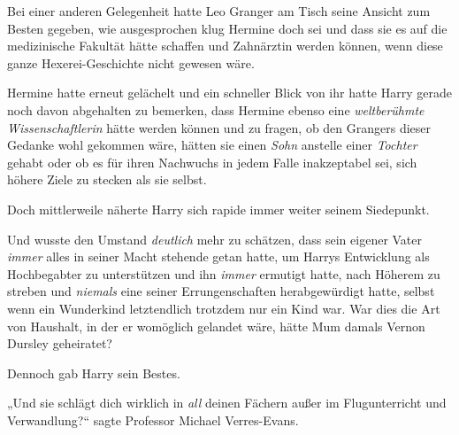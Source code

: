Bei einer anderen Gelegenheit hatte Leo Granger am Tisch seine Ansicht zum Besten gegeben, wie ausgesprochen klug Hermine doch sei und dass sie es auf die medizinische Fakultät hätte schaffen und Zahnärztin werden können, wenn diese ganze Hexerei-Geschichte nicht gewesen wäre.

Hermine hatte erneut gelächelt und ein schneller Blick von ihr hatte Harry gerade noch davon abgehalten zu bemerken, dass Hermine ebenso eine \emph{weltberühmte Wissenschaftlerin} hätte werden können und zu fragen, ob den Grangers dieser Gedanke wohl gekommen wäre, hätten sie einen \emph{Sohn} anstelle einer \emph{Tochter} gehabt oder ob es für ihren Nachwuchs in jedem Falle inakzeptabel sei, sich höhere Ziele zu stecken als sie selbst.

Doch mittlerweile näherte Harry sich rapide immer weiter seinem Siedepunkt.

Und wusste den Umstand \emph{deutlich} mehr zu schätzen, dass sein eigener Vater \emph{immer} alles in seiner Macht stehende getan hatte, um Harrys Entwicklung als Hochbegabter zu unterstützen und ihn \emph{immer} ermutigt hatte, nach Höherem zu streben und \emph{niemals} eine seiner Errungenschaften herabgewürdigt hatte, selbst wenn ein Wunderkind letztendlich trotzdem nur ein Kind war. War dies die Art von Haushalt, in der er womöglich gelandet wäre, hätte Mum damals Vernon Dursley geheiratet?

Dennoch gab Harry sein Bestes.

„Und sie schlägt dich wirklich in \emph{all} deinen Fächern außer im Flugunterricht und Verwandlung?“ sagte Professor Michael Verres-Evans.

